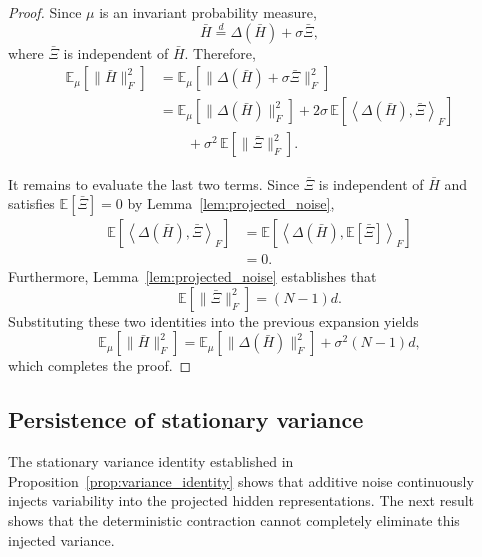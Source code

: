 \documentclass{article}
\begin{document}
\begin{proof}	
	Since
	$\mu$
	is an invariant probability measure,
	\[
	\bar H
	\stackrel{d}{=}
	\Delta(\bar H)
	+
	\sigma\bar\Xi,
	\]
	where
	$\bar\Xi$
	is independent of
	$\bar H$.	
	Therefore,	
	\[
	\begin{aligned}
		\mathbb E_\mu
		\!\left[
		\|\bar H\|_F^2
		\right]
		&=
		\mathbb E_\mu
		\!\left[
		\|
		\Delta(\bar H)
		+
		\sigma\bar\Xi
		\|_F^2
		\right]
		\\
		&=
		\mathbb E_\mu
		\!\left[
		\|\Delta(\bar H)\|_F^2
		\right]
		+
		2\sigma
		\,
		\mathbb E
		\!\left[
		\left\langle
		\Delta(\bar H),
		\bar\Xi
		\right\rangle_F
		\right]
		\\
		&\qquad
		+
		\sigma^2
		\,
		\mathbb E
		\!\left[
		\|\bar\Xi\|_F^2
		\right].
	\end{aligned}
	\]
	
	It remains to evaluate the last two terms.	
	Since
	$\bar\Xi$
	is independent of
	$\bar H$
	and satisfies	
$
	\mathbb E[\bar\Xi]=0
$
	by Lemma~\ref{lem:projected_noise},	
	\[
	\begin{aligned}
		\mathbb E
		\!\left[
		\left\langle
		\Delta(\bar H),
		\bar\Xi
		\right\rangle_F
		\right]
		&=
		\mathbb E
		\!\left[
		\left\langle
		\Delta(\bar H),
		\mathbb E[\bar\Xi]
		\right\rangle_F
		\right]
		\\
		&=
		0.
	\end{aligned}
	\]
	Furthermore,
	Lemma~\ref{lem:projected_noise}
	establishes that	
	\[
	\mathbb E
	\!\left[
	\|\bar\Xi\|_F^2
	\right]
	=
	(N-1)d.
	\]
	Substituting these two identities into the previous expansion yields	
	\[
	\mathbb E_\mu
	\!\left[
	\|\bar H\|_F^2
	\right]
	=
	\mathbb E_\mu
	\!\left[
	\|\Delta(\bar H)\|_F^2
	\right]
	+
	\sigma^2(N-1)d,
	\]
	which completes the proof.
	
\end{proof}

\subsection{Persistence of stationary variance}
\label{sec:variance_persistence}

The stationary variance identity established in
Proposition~\ref{prop:variance_identity}
shows that additive noise continuously injects variability into the
projected hidden representations.
The next result shows that the deterministic contraction cannot
completely eliminate this injected variance.
\end{document}
